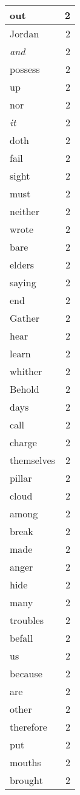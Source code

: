 \begin{center}
\begin{longtable}{l|r}
out & 2 \\ \hline
Jordan & 2 \\ \hline
\emph{and} & 2 \\ \hline
possess & 2 \\ \hline
up & 2 \\ \hline
nor & 2 \\ \hline
\emph{it} & 2 \\ \hline
doth & 2 \\ \hline
fail & 2 \\ \hline
sight & 2 \\ \hline
must & 2 \\ \hline
neither & 2 \\ \hline
wrote & 2 \\ \hline
bare & 2 \\ \hline
elders & 2 \\ \hline
saying & 2 \\ \hline
end & 2 \\ \hline
Gather & 2 \\ \hline
hear & 2 \\ \hline
learn & 2 \\ \hline
whither & 2 \\ \hline
Behold & 2 \\ \hline
days & 2 \\ \hline
call & 2 \\ \hline
charge & 2 \\ \hline
themselves & 2 \\ \hline
pillar & 2 \\ \hline
cloud & 2 \\ \hline
among & 2 \\ \hline
break & 2 \\ \hline
made & 2 \\ \hline
anger & 2 \\ \hline
hide & 2 \\ \hline
many & 2 \\ \hline
troubles & 2 \\ \hline
befall & 2 \\ \hline
us & 2 \\ \hline
because & 2 \\ \hline
are & 2 \\ \hline
other & 2 \\ \hline
therefore & 2 \\ \hline
put & 2 \\ \hline
mouths & 2 \\ \hline
brought & 2 \\ \hline

\end{longtable}
\end{center}
